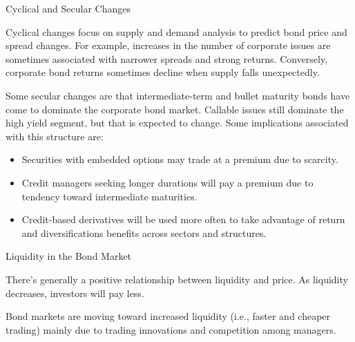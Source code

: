 \documentclass[../custom]{flashcards}
\begin{document}
\begin{flashcard}{Cyclical and Secular Changes}
    \begin{flushleft}
        Cyclical changes focus on supply and demand analysis to predict bond price and spread changes. For example, increases in the number of corporate issues are sometimes associated with narrower spreads and strong returns. Conversely, corporate bond returns sometimes decline when supply falls unexpectedly.\newline

        Some secular changes are that intermediate-term and bullet maturity bonds have come to dominate the corporate bond market. Callable issues still dominate the high yield segment, but that is expected to change. Some implications associated with this structure are:
        \begin{itemize}
            \item Securities with embedded options may trade at a premium due to scarcity.
            \item Credit managers seeking longer durations will pay a premium due to tendency toward intermediate maturities.
            \item Credit-based derivatives will be used more often to take advantage of return and diversifications benefits across sectors and structures.
        \end{itemize}
    \end{flushleft}
\end{flashcard}

\begin{flashcard}{Liquidity in the Bond Market}
    \begin{flushleft}
        There's generally a positive relationship between liquidity and price. As liquidity decreases, investors will pay less.\newline

        Bond markets are moving toward increased liquidity (i.e., faster and cheaper trading) mainly due to trading innovations and competition among managers.
    \end{flushleft}
\end{flashcard}
\end{document}
